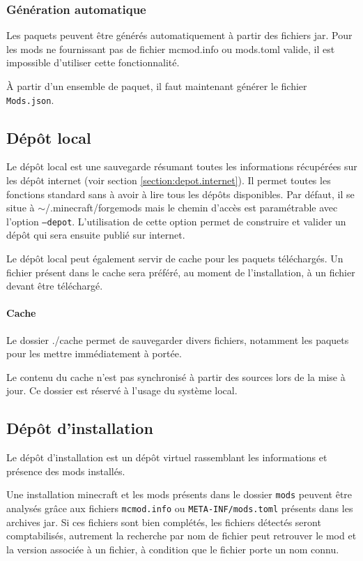 \documentclass{article}
\begin{document}
\subsubsection{Génération automatique}
Les paquets peuvent être générés automatiquement à partir des fichiers jar.
Pour les mods ne fournissant pas de fichier \textsf{mcmod.info} ou \textsf{mods.toml} valide, il est impossible d'utiliser cette fonctionnalité.

À partir d'un ensemble de paquet, il faut maintenant générer le fichier \texttt{Mods.json}.


\subsection{Dépôt local}
\label{section:depot.local}
Le dépôt local est une sauvegarde résumant toutes les informations récupérées sur les dépôt internet (voir section \ref{section:depot.internet}).
Il permet toutes les fonctions standard sans à avoir à lire tous les dépôts disponibles.
Par défaut, il se situe à \textsf{$\sim$/.minecraft/forgemods} mais le chemin d'accès est paramétrable avec l'option \texttt{--depot}.
L'utilisation de cette option permet de construire et valider un dépôt qui sera ensuite publié sur internet.

Le dépôt local peut également servir de cache pour les paquets téléchargés.
Un fichier présent dans le cache sera préféré, au moment de l'installation, à un fichier devant être téléchargé.

\paragraph{Cache}
Le dossier \textsf{./cache} permet de sauvegarder divers fichiers, notamment les paquets pour les mettre immédiatement à portée.

Le contenu du cache n'est pas synchronisé à partir des sources lors de la mise à jour.
Ce dossier est réservé à l'usage du système local.

\subsection{Dépôt d'installation}
\label{section:depot.installation}
Le dépôt d'installation est un dépôt virtuel rassemblant les informations et présence des mods installés.

Une installation minecraft et les mods présents dans le dossier \texttt{mods} peuvent être analysés grâce aux fichiers \texttt{mcmod.info} ou \texttt{META-INF/mods.toml} présents dans les archives jar.
Si ces fichiers sont bien complétés, les fichiers détectés seront comptabilisés, autrement la recherche par nom de fichier peut retrouver le mod et la version associée à un fichier, à condition que le fichier porte un nom connu.
\end{document}
